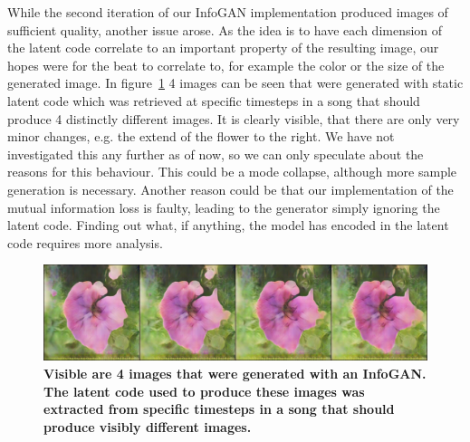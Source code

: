         While the second iteration of our InfoGAN implementation produced images of sufficient quality, another issue arose. As the idea is to have each dimension of the latent code correlate to an important property of the resulting image, our hopes were for the beat to correlate to, for example the color or the size of the generated image. In figure~\ref{fig:infogan_res_2} 4 images can be seen that were generated with static latent code which was retrieved at specific timesteps in a song that should produce 4 distinctly different images. It is clearly visible, that there are only very minor changes, e.g. the extend of the flower to the right. We have not investigated this any further as of now, so we can only speculate about the reasons for this behaviour. This could be a mode collapse, although more sample generation is necessary. Another reason could be that our implementation of the mutual information loss is faulty, leading to the generator simply ignoring the latent code. Finding out what, if anything, the model has encoded in the latent code requires more analysis.
        
        \begin{figure}[ht]
            \centering
            \includegraphics[width=.94\textwidth]{images/fixed_160}
            \caption[Images generated from InfoGan.]
            {
                \textbf{Visible are 4 images that were generated with an InfoGAN. The latent code used to produce these images was extracted from specific timesteps in a song that should produce visibly different images.}
            }
            \label{fig:infogan_res_2}
        \end{figure}